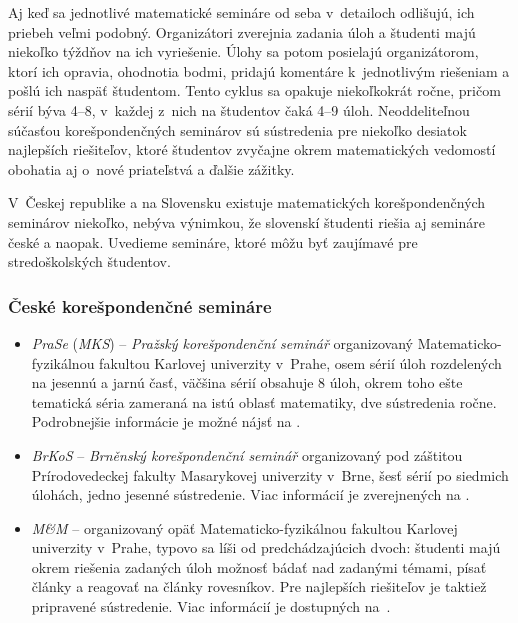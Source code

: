 Aj keď sa jednotlivé matematické semináre od seba v~detailoch odlišujú, ich priebeh veľmi podobný. Organizátori zverejnia zadania úloh a študenti majú niekoľko týždňov na ich vyriešenie. Úlohy sa potom posielajú organizátorom, ktorí ich opravia, ohodnotia bodmi, pridajú komentáre k~jednotlivým riešeniam a pošlú ich naspäť študentom. Tento cyklus sa opakuje niekoľkokrát ročne, pričom sérií býva 4--8, v~každej z~nich na študentov čaká 4--9 úloh. Neoddeliteľnou súčasťou korešpondenčných seminárov sú sústredenia pre niekoľko desiatok najlepších riešiteľov, ktoré študentov zvyčajne okrem matematických vedomostí obohatia aj o~nové priateľstvá a ďalšie zážitky.

V~Českej republike a na Slovensku existuje matematických korešpondenčných seminárov niekoľko, nebýva výnimkou, že slovenskí študenti riešia aj semináre české a naopak. Uvedieme semináre, ktoré môžu byť zaujímavé pre stredoškolských študentov.

\subsubsection{České korešpondenčné semináre}
\begin{itemize}
\item \textit{PraSe} (\textit{MKS}) -- \textit{Pražský korešpondenční seminář} organizovaný Matematicko-fyzikálnou fakultou  Karlovej univerzity v~Prahe, osem sérií úloh rozdelených na jesennú a jarnú časť, väčšina sérií obsahuje 8 úloh, okrem toho ešte tematická séria zameraná na istú oblasť matematiky, dve sústredenia ročne. Podrobnejšie informácie je možné nájsť na \cite{PraSe}.
\item \textit{BrKoS} -- \textit{Brněnský korešpondenční seminář} organizovaný pod záštitou Prírodovedeckej fakulty Masarykovej univerzity v~Brne, šesť sérií po siedmich úlohách, jedno jesenné sústredenie. Viac informácií je zverejnených na \cite{brkos}.
\item \textit{M\&M} -- organizovaný opäť Matematicko-fyzikálnou fakultou Karlovej univerzity v~Prahe, typovo sa líši od predchádzajúcich dvoch: študenti majú okrem riešenia zadaných úloh možnosť bádať nad zadanými témami, písať články a reagovať na články rovesníkov. Pre najlepších riešiteľov je taktiež pripravené sústredenie. Viac informácií je dostupných na~\cite{mam}.
\end{itemize}

